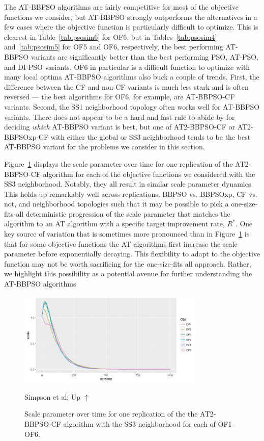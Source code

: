 \documentclass[cmbright]{staauth}
\begin{document}
The AT-BBPSO algorithms are fairly competitive for most of the objective functions we consider, but AT-BBPSO strongly outperforms the alternatives in a few cases where the objective function is particularly difficult to optimize. This is clearest in Table~\ref{tab:psosim6} for OF6, but in Tables~\ref{tab:psosim4} and~\ref{tab:psosim5} for OF5 and OF6, respectively, the best performing AT-BBPSO variants are significantly better than the best performing PSO, AT-PSO, and DI-PSO variants. OF6 in particular is a difficult function to optimize with many local optima AT-BBPSO algorithms also buck a couple of trends. First, the difference between the CF and non-CF variants is much less stark and is often reversed --- the best algorithms for OF6, for example, are AT-BBPSO-CF variants. Second, the SS1 neighborhood topology often works well for AT-BBPSO variants. There does not appear to be a hard and fast rule to abide by for deciding \emph{which} AT-BBPSO variant is best, but one of AT2-BBPSO-CF or AT2-BBPSOxp-CF with either the global or SS3 neighborhood tends to be the best AT-BBPSO variant for the problems we consider in this section.

Figure~\ref{fig:scale} displays the scale parameter over time for one replication of the AT2-BBPSO-CF algorithm for each of the objective functions we considered with the SS3 neighborhood. Notably, they all result in similar scale parameter dynamics. This holds up remarkably well across replications, BBPSO vs. BBPSOxp, CF vs. not, and neighborhood topologies such that it may be possible to pick a one-size-fits-all deterministic progression of the scale parameter that matches the algorithm to an AT algorithm with a specific target improvement rate, $R^*$. One key source of variation that is sometimes more pronounced than in Figure~\ref{fig:scale} is that for some objective functions the AT algorithms first increase the scale parameter before exponentially decaying. This flexibility to adapt to the objective function may not be worth sacrificing for the one-size-fits all approach. Rather, we highlight this possibility as a potential avenue for further understanding the AT-BBPSO algorithms.

\begin{figure}[p]
\begin{preview}
\centering
\includegraphics[width=0.8\textwidth]{scaleplot.png}
\ifPreview
\caption{Simpson et al; Up $\uparrow$}
\else
\caption{Scale parameter over time for one replication of the the AT2-BBPSO-CF algorithm with the SS3 neighborhood for each of OF1--OF6.}
\label{fig:scale}
\fi
\end{preview}
\end{figure}
\end{document}
